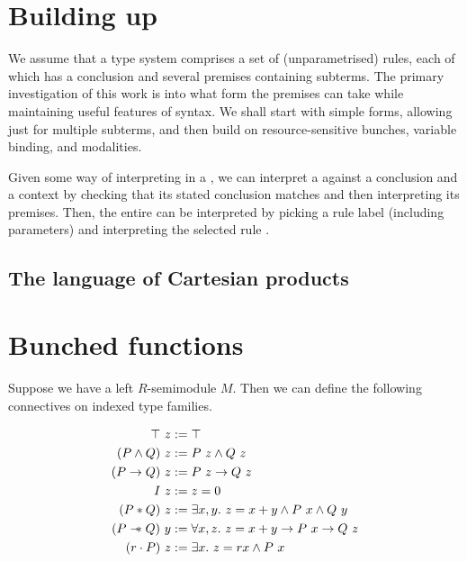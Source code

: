 \section{Building up}

We assume that a type system comprises a set of (unparametrised) rules, each
of which has a conclusion and several premises containing subterms.
The primary investigation of this work is into what form the premises can take
while maintaining useful features of syntax.
We shall start with simple forms, allowing just for multiple subterms, and
then build on resource-sensitive bunches, variable binding, and modalities.

\System{}
\Rule{}

Given some way  of interpreting
 in a , we can interpret a
 against a conclusion and a context by checking that its
stated conclusion matches and then interpreting its premises.
Then, the entire  can be interpreted by picking a rule
label (including parameters)  and interpreting the selected rule
\AgdaSpace{}.

\semr{}
\sems{}

\subsection{The language of Cartesian products}

\SimplePremises

\section{Bunched functions}

Suppose we have a left $R$-semimodule $M$.
Then we can define the following connectives on indexed type families.

\begin{align*}
  \top~z &:= \top \\
  (P \wedge Q)~z &:= P~z \wedge Q~z \\
  (P \to Q)~z &:= P~z \to Q~z \\
  I~z &:= z = 0 \\
  (P * Q)~z &:= \exists x,y.~z = x+y \wedge P~x \wedge Q~y \\
  (P \mathrel{\mathord{-}\hspace{-0.75ex}*} Q)~y &:= \forall x,z.~z = x+y \to P~x \to Q~z \\
  (r \cdot P)~z &:= \exists x.~z = rx \wedge P~x
\end{align*}

